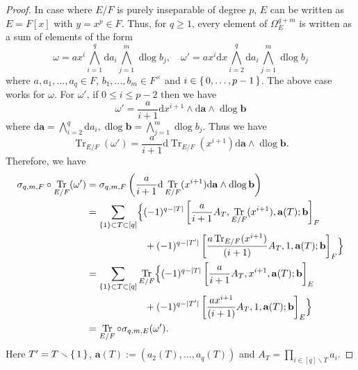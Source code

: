 \documentclass[a4paper,12pt,reqno]{amsart}
\numberwithin{equation}{section}
\theoremstyle{definition}
\DeclareMathOperator{\dlog}{dlog}
\DeclareMathOperator{\Tr}{Tr}
\renewcommand{\d}{\mathrm{d}}
\newcommand{\va}{\mathbf{a}}
\newcommand{\vb}{\mathbf{b}}
\begin{document}
\begin{proof}
    In case where $E/F$ is purely inseparable of degree $p$, $E$ can be written as $E=F[x]$ with $y=x^p\in F$.
    Thus, for $q\ge 1$, every element of $\Omega_E^{q+m}$ is written as a sum of elements of the form
    \[
    \omega=ax^i\bigwedge_{i=1}^q\d a_i\bigwedge_{j=1}^m\dlog b_j,\quad \omega'=ax^i\d x\bigwedge_{i=2}^q\d a_i\bigwedge_{j=1}^m\dlog b_j
    \]
    where $a, a_1,\dots, a_q\in F$, $b_1,\dots,b_m\in F^\times$ and $i\in\set{0,\dots, p-1}$.
    The above case works for $\omega$.
    For $\omega'$, if $0\le i\le p-2$ then we have
    \[
    \omega'
    =\frac{a}{i+1}\d x^{i+1}\wedge \d\va\wedge\dlog \vb
    \]
    where $\d\va=\bigwedge_{i=2}^q\d a_i, \dlog\vb=\bigwedge_{j=1}^m\dlog b_j.$
    Thus we have
    \[
    \Tr_{E/F}(\omega')=\frac{a}{i+1}\d \Tr_{E/F}(x^{i+1})\d\va\wedge\dlog \vb.
    \]
    Therefore, we have
    \begin{align*}
        \sigma_{q,m,F}\circ\Tr_{E/F}(\omega')
        &=\sigma_{q,m,F}\left(\frac{a}{i+1}\d\Tr_{E/F}(x^{i+1})\d\va\wedge\dlog \vb\right)\\
        &=\sum_{\{1\}\subset T\subset[q]}\Bigl\{(-1)^{q-|T|}
        \left[
        \frac{a}{i+1}A_T%
        ,\Tr_{E/F}(x^{i+1}),\va(T);\vb
        \right]_F\\
        &\qquad \qquad \qquad +(-1)^{q-|T'|}
        \left[
        \frac{a\Tr_{E/F}(x^{i+1})}{(i+1)}A_T%
        ,1,\va(T);\vb
        \right]_F 
         \Bigr\}\\
        &=\sum_{\{1\}\subset T\subset[q]}\Tr_{E/F}\Bigl\{(-1)^{q-|T|}
        \left[
        \frac{a}{i+1}A_T%
        ,x^{i+1},\va(T);\vb
        \right]_E\\
        &\qquad \qquad \qquad +(-1)^{q-|T'|}
        \left[
        \frac{ax^{i+1}}{(i+1)}A_T%
        ,1,\va(T);\vb
        \right]_E 
         \Bigr\}\\
         &=\Tr_{E/F}\circ \sigma_{q,m,E}(\omega').
    \end{align*}
    Here $T'=T\smallsetminus\set{1}$, $\va(T):=(a_2(T),\ldots,a_q(T))$ and $A_T=\prod_{i\in [q]\smallsetminus T}a_i$.
    

\end{proof}
\end{document}
